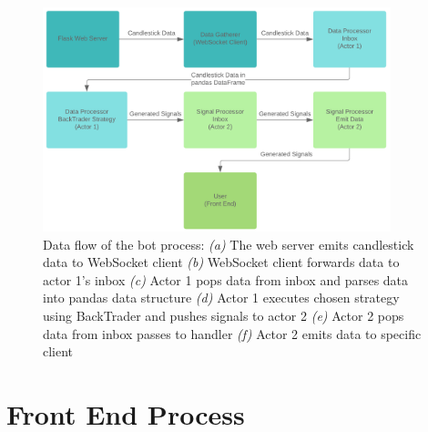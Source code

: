 \begin{figure}[htb]
    \centering
	\includegraphics[width=0.9\textwidth]{content/graphics/diagrams/actor_dataflow.png}
	\caption{Data flow of the bot process: 
	\textit{(a)} The web server emits candlestick data to WebSocket client
	\textit{(b)} WebSocket client forwards data to actor 1's inbox
    \textit{(c)} Actor 1 pops data from inbox and parses data into pandas data structure
    \textit{(d)} Actor 1 executes chosen strategy using BackTrader and pushes signals to actor 2
    \textit{(e)} Actor 2 pops data from inbox passes to handler
    \textit{(f)} Actor 2 emits data to specific client}
    
	\label{fig:implementation:actor_dataflow}
\end{figure}







\section{Front End Process}
\label{sec:implementation:frontend}